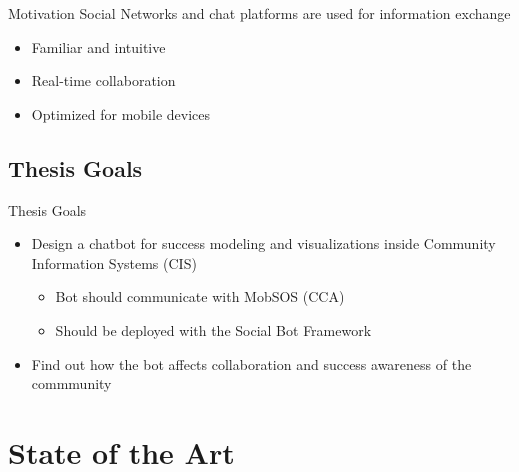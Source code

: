 \begin{frame}{Motivation}
  Social Networks and chat platforms are used for information exchange
  \begin{itemize}
    \item Familiar and intuitive
    \item Real-time collaboration
    \item Optimized for mobile devices
  \end{itemize}
\end{frame}


\subsection{Thesis Goals}

\begin{frame}{Thesis Goals}
  \begin{itemize}
    \item Design a chatbot for success modeling and visualizations
          inside Community Information Systems (CIS)
          \begin{itemize}
            \item Bot should communicate with MobSOS (CCA) %
            \item Should be deployed with the Social Bot Framework
          \end{itemize}
    \item Find out how the bot affects collaboration and success awareness of the commmunity %
  \end{itemize}
\end{frame}

\section{State of the Art}

